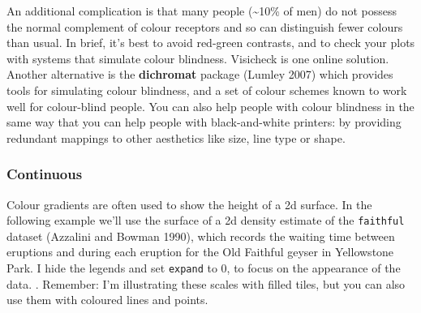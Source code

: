 An additional complication is that many people (\textasciitilde{}10\% of
men) do not possess the normal complement of colour receptors and so can
distinguish fewer colours than usual.  In brief,
it's best to avoid red-green contrasts, and to check your plots with
systems that simulate colour blindness. Visicheck is one online
solution. Another alternative is the \textbf{dichromat} package (Lumley
2007) which provides tools for simulating colour blindness, and a set of
colour schemes known to work well for colour-blind people. You can also
help people with colour blindness in the same way that you can help
people with black-and-white printers: by providing redundant mappings to
other aesthetics like size, line type or shape.

\hypertarget{ssub:colour-continuous}{%
\subsubsection{Continuous}\label{ssub:colour-continuous}}

Colour gradients are often used to show the height of a 2d surface. In
the following example we'll use the surface of a 2d density estimate of
the \texttt{faithful} dataset (Azzalini and Bowman 1990), which records
the waiting time between eruptions and during each eruption for the Old
Faithful geyser in Yellowstone Park. I hide the legends and set
\texttt{expand} to 0, to focus on the appearance of the data.
 . Remember: I'm
illustrating these scales with filled tiles, but you can also use them
with coloured lines and points.

\begin{Shaded}
\begin{Highlighting}[]
\StringTok{ }\OperatorTok{+}
\StringTok{  }\NormalTok{() }\OperatorTok{+}
\StringTok{  }\NormalTok{(}\NormalTok{, } \NormalTok{(}\NormalTok{, }\NormalTok{)) }\OperatorTok{+}\StringTok{ }
\StringTok{  }\NormalTok{(}\NormalTok{, } \NormalTok{(}\NormalTok{, }\NormalTok{)) }\OperatorTok{+}\StringTok{ }
\StringTok{  }\NormalTok{(} \NormalTok{)}
\end{Highlighting}
\end{Shaded}

